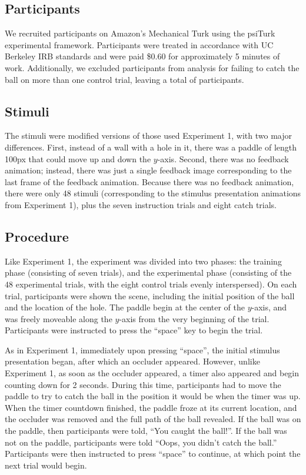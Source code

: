\documentclass[10pt,letterpaper]{article}
\begin{document}
\subsection{Participants}

We recruited \PaddleNumComplete{} participants on Amazon's Mechanical Turk using the psiTurk \cite{McDonnell12} experimental framework.
Participants were treated in accordance with UC Berkeley IRB standards and were paid \$0.60 for approximately 5 minutes of work.
Additionally, we excluded \PaddleNumFailed{} participants from analysis for failing to catch the ball on more than one control trial, leaving a total of \PaddleNumOk{} participants.

\subsection{Stimuli}

The stimuli were modified versions of those used Experiment 1, with two major differences.
First, instead of a wall with a hole in it, there was a paddle of length 100px that could move up and down the $y$-axis.
Second, there was no feedback animation; instead, there was just a single feedback image corresponding to the last frame of the feedback animation.
Because there was no feedback animation, there were only 48 stimuli (corresponding to the stimulus presentation animations from Experiment 1), plus the seven instruction trials and eight catch trials.

\subsection{Procedure}

Like Experiment 1, the experiment was divided into two phases: the training phase (consisting of seven trials), and the experimental phase (consisting of the 48 experimental trials, with the eight control trials evenly interspersed).
On each trial, participants were shown the scene, including the initial position of the ball and the location of the hole.
The paddle begin at the center of the $y$-axis, and was freely moveable along the $y$-axis from the very beginning of the trial.
Participants were instructed to press the ``space'' key to begin the trial. 

As in Experiment 1, immediately upon pressing ``space'', the initial stimulus presentation began, after which an occluder appeared.
However, unlike Experiment 1, as soon as the occluder appeared, a timer also appeared and begin counting down for 2 seconds.
During this time, participants had to move the paddle to try to catch the ball in the position it would be when the timer was up.
When the timer countdown finished, the paddle froze at its current location, and the occluder was removed and the full path of the ball revealed.
If the ball was on the paddle, then participants were told, ``You caught the ball!''.
If the ball was not on the paddle, participants were told ``Oops, you didn't catch the ball.''
Participants were then instructed to press ``space'' to continue, at which point the next trial would begin.
\end{document}
